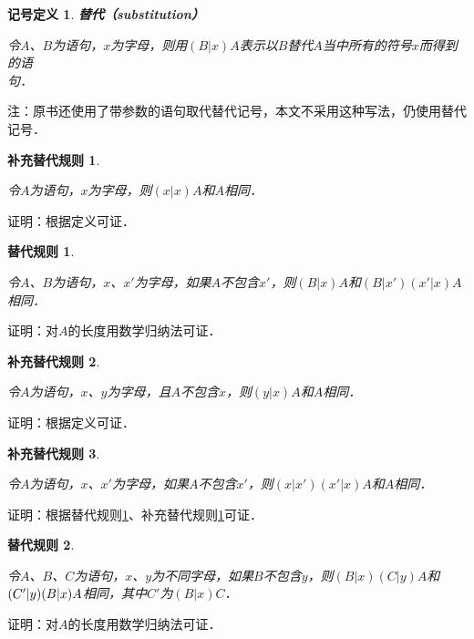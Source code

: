 \documentclass[12pt, a4paper, oneside]{book}
\newtheorem{sign}{记号定义}
\newtheorem{CS}{替代规则}
\newtheorem{CScor}{补充替代规则}
\begin{document}
			\begin{sign}
				\textbf{替代（substitution）}
				\par
				令$A$、$B$为语句，$x$为字母，则用$(B|x)A$表示以$B$替代$A$当中所有的符号$x$而得到的语\\句．
			\end{sign}
			注：原书还使用了带参数的语句取代替代记号，本文不采用这种写法，仍使用替代记号．

			\begin{CScor}\label{CScor1}
				\hfill\par
				令$A$为语句，$x$为字母，则$(x|x)A$和$A$相同．
			\end{CScor}		
			证明：根据定义可证．

			\begin{CS}\label{CS1}
				\hfill\par
				令$A$、$B$为语句，$x$、$x'$为字母，如果$A$不包含$x'$，则$(B|x)A$和$(B|x')(x'|x)A$相同．
			\end{CS}		
			证明：对$A$的长度用数学归纳法可证．

			\begin{CScor}\label{CScor2}
				\hfill\par
				令$A$为语句，$x$、$y$为字母，且$A$不包含$x$，则$(y|x)A$和$A$相同．
			\end{CScor}		
			证明：根据定义可证．
			

			\begin{CScor}\label{CScor3}
				\hfill\par
				令$A$为语句，$x$、$x'$为字母，如果$A$不包含$x'$，则$(x|x')(x'|x)A$和$A$相同．
			\end{CScor}		
			证明：根据替代规则\ref{CS1}、补充替代规则\ref{CScor1}可证．

			\begin{CS}\label{CS2}
				\hfill\par
				令$A$、$B$、$C$为语句，$x$、$y$为不同字母，如果$B$不包含$y$，则$(B|x)(C|y)A$和$(C'|y)(B|x)\\A$相同，其中$C'$为$(B|x)C$．
			\end{CS}		
			证明：对$A$的长度用数学归纳法可证．
\end{document}
